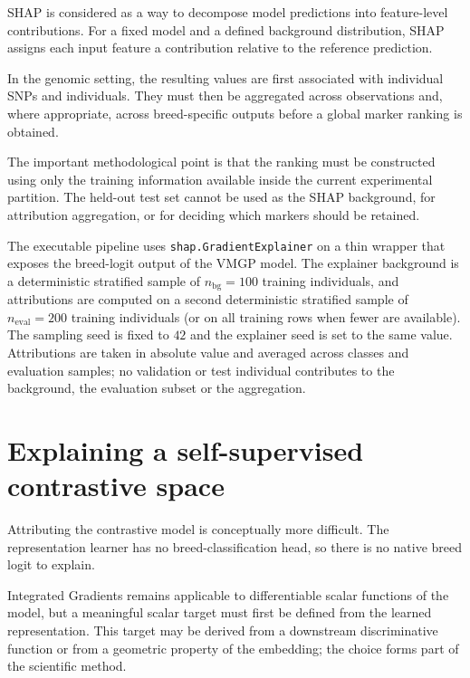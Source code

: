 SHAP \cite{shapley1953value, lundberg2017unified} is considered as a
way to decompose model predictions into feature-level contributions.
For a fixed model and a defined background distribution, SHAP assigns
each input feature a contribution relative to the reference
prediction.

In the genomic setting, the resulting values are first associated with
individual SNPs and individuals. They must then be aggregated across
observations and, where appropriate, across breed-specific outputs
before a global marker ranking is obtained.

The important methodological point is that the ranking must be
constructed using only the training information available inside the
current experimental partition. The held-out test set cannot be used as
the SHAP background, for attribution aggregation, or for deciding
which markers should be retained.

The executable pipeline uses \texttt{shap.GradientExplainer} on a thin
wrapper that exposes the breed-logit output of the VMGP model. The
explainer background is a deterministic stratified sample of
$n_{\mathrm{bg}}=100$ training individuals, and attributions are
computed on a second deterministic stratified sample of
$n_{\mathrm{eval}}=200$ training individuals (or on all training rows
when fewer are available). The sampling seed is fixed to $42$ and the
explainer seed is set to the same value. Attributions are taken in
absolute value and averaged across classes and evaluation samples; no
validation or test individual contributes to the background, the
evaluation subset or the aggregation.

\section{Explaining a self-supervised contrastive space}
\label{sec:contrastive_marker_attribution}

Attributing the contrastive model is conceptually more difficult. The
representation learner has no breed-classification head, so there is
no native breed logit to explain.

Integrated Gradients \cite{sundararajan2017axiomatic} remains
applicable to differentiable scalar functions of the model, but a
meaningful scalar target must first be defined from the learned
representation. This target may be derived from a downstream
discriminative function or from a geometric property of the embedding;
the choice forms part of the scientific method.

